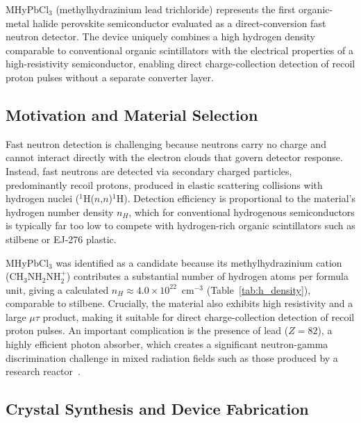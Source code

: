 MHyPbCl$_3$ (methylhydrazinium lead trichloride) represents the
first organic-metal halide perovskite semiconductor evaluated as
a direct-conversion fast neutron detector.  The device uniquely
combines a high hydrogen density comparable to conventional
organic scintillators with the electrical properties of a
high-resistivity semiconductor, enabling direct charge-collection
detection of recoil proton pulses without a separate converter
layer.

\subsection{Motivation and Material Selection}
\label{sec:neutron_motivation}

Fast neutron detection is challenging because neutrons carry no
charge and cannot interact directly with the electron clouds that
govern detector response.  Instead, fast neutrons are detected via
secondary charged particles, predominantly recoil protons,
produced in elastic scattering collisions with hydrogen nuclei
($^1$H($n$,$n$)$^1$H).  Detection efficiency is proportional to
the material's hydrogen number density $n_H$, which for
conventional hydrogenous semiconductors is typically far too low
to compete with hydrogen-rich organic scintillators such as
stilbene or EJ-276 plastic.

MHyPbCl$_3$ was identified as a candidate because its
methylhydrazinium cation (CH$_3$NH$_2$NH$_2^+$) contributes a
substantial number of hydrogen atoms per formula unit, giving a
calculated $n_H \approx 4.0 \times 10^{22}$~cm$^{-3}$
(Table~\ref{tab:h_density}), comparable to stilbene.  Crucially,
the material also exhibits high resistivity and a large $\mu\tau$
product, making it suitable for direct charge-collection detection
of recoil proton pulses.  An important complication is the
presence of lead ($Z = 82$), a highly efficient photon absorber,
which creates a significant neutron-gamma discrimination challenge
in mixed radiation fields such as those produced by a research
reactor~\cite{Panaccione_NIM_2024}.

\subsection{Crystal Synthesis and Device Fabrication}
\label{sec:mhy_fabrication}

